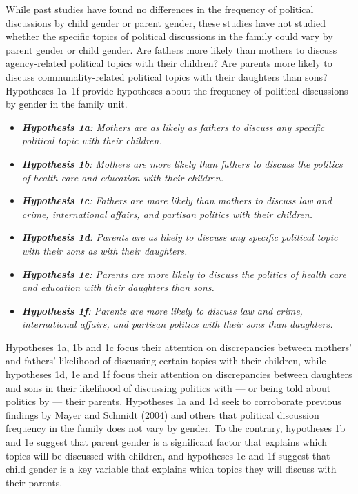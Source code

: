 \documentclass[
  letterpaper,
  DIV=11,
  numbers=noendperiod]{scrreprt}
\begin{document}
While past studies have found no differences in the frequency of
political discussions by child gender or parent gender, these studies
have not studied whether the specific topics of political discussions in
the family could vary by parent gender or child gender. Are fathers more
likely than mothers to discuss agency-related political topics with
their children? Are parents more likely to discuss communality-related
political topics with their daughters than sons? Hypotheses 1a--1f
provide hypotheses about the frequency of political discussions by
gender in the family unit.

\begin{itemize}
\item
  \emph{\textbf{Hypothesis 1a}: Mothers are as likely as fathers to
  discuss any specific political topic with their children.}
\item
  \emph{\textbf{Hypothesis 1b}: Mothers are more likely than fathers to
  discuss the politics of health care and education with their
  children.}
\item
  \emph{\textbf{Hypothesis 1c}: Fathers are more likely than mothers to
  discuss law and crime, international affairs, and partisan politics
  with their children.}
\item
  \emph{\textbf{Hypothesis 1d}: Parents are as likely to discuss any
  specific political topic with their sons as with their daughters.}
\item
  \emph{\textbf{Hypothesis 1e}: Parents are more likely to discuss the
  politics of health care and education with their daughters than sons.}
\item
  \emph{\textbf{Hypothesis 1f}: Parents are more likely to discuss law
  and crime, international affairs, and partisan politics with their
  sons than daughters.}
\end{itemize}

Hypotheses 1a, 1b and 1c focus their attention on discrepancies between
mothers' and fathers' likelihood of discussing certain topics with their
children, while hypotheses 1d, 1e and 1f focus their attention on
discrepancies between daughters and sons in their likelihood of
discussing politics with --- or being told about politics by --- their
parents. Hypotheses 1a and 1d seek to corroborate previous findings by
Mayer and Schmidt (2004) and others that political discussion frequency
in the family does not vary by gender. To the contrary, hypotheses 1b
and 1e suggest that parent gender is a significant factor that explains
which topics will be discussed with children, and hypotheses 1c and 1f
suggest that child gender is a key variable that explains which topics
they will discuss with their parents.
\end{document}
